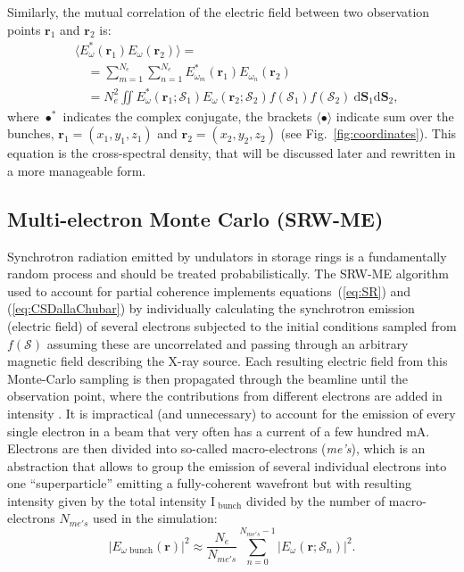 \documentclass{iucr}
\newcommand{\inblue}[1]{{\color{blue}#1}}
\begin{document}
Similarly, the mutual correlation of the electric field between two observation points $\textbf{r}_1$ and $\textbf{r}_2$ is:
\begin{equation}\label{eq:CSDallaChubar}
\begin{split}
      &\big\langle E^*_{\omega}(\textbf{r}_1) E_{\omega}(\textbf{r}_2)\big\rangle = \\
      &\quad = \sum_{m=1}^{N_e} \sum_{n=1}^{N_e} E^*_{\omega_{m}}(\textbf{r}_1) E_{\omega_{n}}(\textbf{r}_2)\\
      &\quad = N_e^2\iint
      E^*_{\omega}(\textbf{r}_1;\mathcal{S}_1)
      E_{\omega}(\textbf{r}_2;\mathcal{S}_2)
      f(\mathcal{S}_1) f(\mathcal{S}_2)~
      \text{d}\textbf{S}_1 \text{d}\textbf{S}_2,
\end{split}
\end{equation}
where $\bullet^*$ indicates the complex conjugate, the brackets $\langle \bullet \rangle$ indicate sum over the bunches, $\textbf{r}_1=(x_1,y_1,z_1)$ and $\textbf{r}_2=(x_2,y_2,z_2)$ (see \inblue{Fig.~\ref{fig:coordinates}}). This equation is the cross-spectral density, that will be discussed later and rewritten in a more manageable form.

\subsection{Multi-electron Monte Carlo (SRW-ME)}

Synchrotron radiation emitted by undulators in storage rings is a fundamentally random process and should be treated probabilistically. The SRW-ME algorithm used to account for partial coherence implements equations~(\ref{eq:SR}) and (\ref{eq:CSDallaChubar}) by individually calculating the synchrotron emission (electric field) of several electrons subjected to the initial conditions sampled from $f(\mathcal{S})$ assuming these are uncorrelated and passing through an arbitrary magnetic field describing the X-ray source. Each resulting electric field from this Monte-Carlo sampling is then propagated through the beamline until the observation point, where the contributions from different electrons are added in intensity \cite{codeSRW_ME}. It is impractical (and unnecessary) to account for the emission of every single electron in a beam that very often has a current of a few hundred mA. Electrons are then divided into so-called macro-electrons (\textit{me's}), which is an abstraction that allows to group the emission of several individual electrons into one ``superparticle'' emitting a fully-coherent wavefront but with resulting intensity given by the total intensity $\text{I}_\text{~bunch}$ divided by the number of macro-electrons $N_{me's}$ used in the simulation:
\begin{equation}
|E_{\omega\text{~bunch}}(\textbf{r})|^2 \approx \frac{N_e}{N_{me's}}\sum_{n=0}^{N_{me's} - 1}\big| E_\omega(\textbf{r};\mathcal{S}_n)\big|^2.
\label{eq:SR_SRW}
\end{equation}
\end{document}
